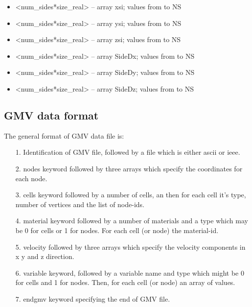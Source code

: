 \documentclass[10pt]{article}
\newcommand*{\tc}{\ttfamily} %
\begin{document}
\begin{itemize}
    \item {\tc <num\_sides*size\_real>} -- array {\tc xsi}; values 
          from {\tc 1} to {\tc NS} 
    \item {\tc <num\_sides*size\_real>} -- array {\tc ysi}; values 
          from {\tc 1} to {\tc NS} 
    \item {\tc <num\_sides*size\_real>} -- array {\tc zsi}; values 
          from {\tc 1} to {\tc NS} 

    \item {\tc <num\_sides*size\_real>} -- array {\tc SideDx}; values 
          from {\tc 1} to {\tc NS} 
    \item {\tc <num\_sides*size\_real>} -- array {\tc SideDy}; values 
          from {\tc 1} to {\tc NS} 
    \item {\tc <num\_sides*size\_real>} -- array {\tc SideDz}; values 
          from {\tc 1} to {\tc NS} 

    \end{itemize}

    \subsection{GMV data format}
    \label{gmvformat}

    The general format of GMV data file is:
    \begin{itemize}
    \item[1.] Identification of GMV file, followed by a file 
              which is either {\tc ascii} or {\tc ieee}.
    \item[2.] {\tc nodes} keyword followed by three 
              arrays which specify the coordinates for each
              node.
    \item[3.] {\tc cells} keyword followed by a number
              of cells, an then for each cell it's type, number 
              of vertices  
              and the list of node-ids.
    \item[4.] {\tc material} keyword followed by a number
              of materials and a type which may be 0 for 
              cells or 1 for nodes.
              For each cell (or node) the material-id.
    \item[5.] {\tc velocity} followed by three
              arrays which specify the velocity components
              in x y and z direction.
    \item[6.] {\tc variable} keyword, followed by a variable
              name and type which might be 0 for cells and
              1 for nodes. Then, for each cell (or node) an
              array of values.
    \item[7.] {\tc endgmv} keyword specifying the end of GMV
              file.                
    \end{itemize}
\end{document}
